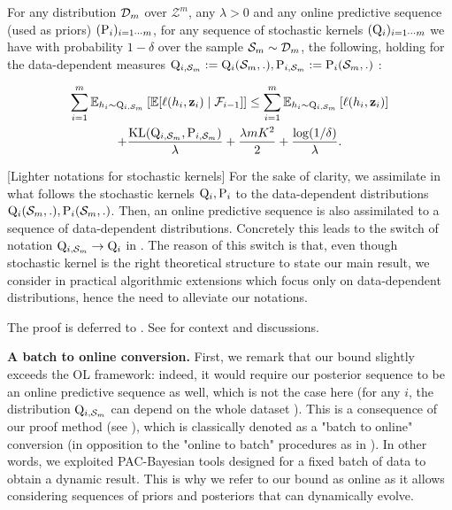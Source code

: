 \begin{theorem}
  \label{th: main_thm_online}
  For any distribution $\Dm$ over $\mathcal{Z}^m$, any $\lambda>0$ and any online predictive sequence (used as priors) $(\P_{i})_{i=1\cdots m}$, for any sequence of stochastic kernels $(\Q_{i})_{i=1\cdots m}$ we have with probability $1-\delta$ over the sample $\Sm\sim\Dm$, the following, holding for the data-dependent measures $\Q_{i,\Sm}:= \Q_{i}(\Sm,.), \P_{i,\Sm}:= \P_{i}(\Sm,.)$ :

  \begin{multline*} 
    \sum_{i=1}^m \mathbb{E}_{h_i\sim \Q_{i,\Sm}}\left[ \mathbb{E}[\ell(h_i,\z_i) \mid \mathcal{F}_{i-1}]    \right]  \leq \sum_{i=1}^m \mathbb{E}_{h_i\sim \Q_{i,\Sm}}\left[ \ell(h_i,\z_i) \right] \\
    + \frac{\operatorname{KL}(\Q_{i,\Sm}, \P_{i,\Sm})}{\lambda} + \frac{\lambda m K^2}{2} + \frac{\log(1/\delta)}{\lambda}. \end{multline*}

\end{theorem}

\begin{remark}
  \label{rem: notations}[Lighter notations for stochastic kernels]
  For the sake of clarity, we assimilate in what follows the stochastic kernels $\Q_{i},\P_{i}$ to the data-dependent distributions $\Q_{i}(\Sm,.), \P_{i}(\Sm,.)$. Then, an online predictive sequence is also assimilated to a sequence of data-dependent distributions. Concretely this leads to the switch of notation $\Q_{i,\Sm}\rightarrow \Q_{i}$ in . The reason of this switch is that, even though stochastic kernel is the right theoretical structure to state our main result, we consider in  practical algorithmic extensions which focus only on data-dependent distributions, hence the need to alleviate our notations.
\end{remark}

The proof is deferred to . See  for context and discussions.

\textbf{A batch to online conversion.}
   First, we remark that our bound slightly exceeds the OL framework: indeed, it would require our posterior sequence to be an online predictive sequence as well, which is not the case here (for any $i$, the distribution $\Q_{i,\Sm}$ can depend on the whole dataset ). This is a consequence of our proof method (see ), which is classically denoted as a "batch to online" conversion (in opposition to the "online to batch" procedures as in \citealp{dekel2005data}). In other words, we exploited PAC-Bayesian tools designed for a fixed batch of data to obtain a dynamic result. This is why we refer to our bound as online as it allows considering sequences of priors and posteriors that can dynamically evolve.




